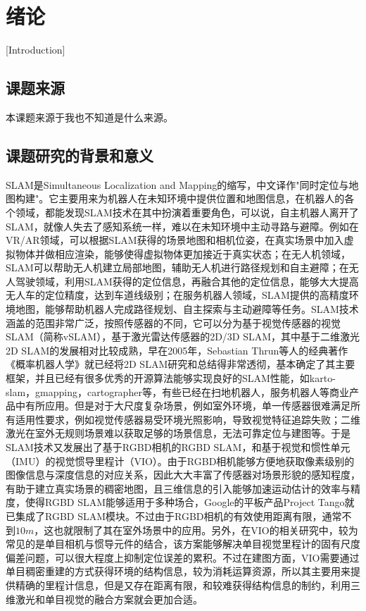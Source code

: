 
\chapter{绪论}[Introduction]

\section{课题来源}
本课题来源于我也不知道是什么来源。

\section{课题研究的背景和意义}%
SLAM是Simultaneous Localization and Mapping的缩写，中文译作"同时定位与地图构建"\cite{Gao2017SLAM}。它主要用来为机器人在未知环境中提供位置和地图信息，在机器人的各个领域，都能发现SLAM技术在其中扮演着重要角色，可以说，自主机器人离开了SLAM，就像人失去了感知系统一样，难以在未知环境中主动寻路与避障。例如在VR/AR领域，可以根据SLAM获得的场景地图和相机位姿，在真实场景中加入虚拟物体并做相应渲染，能够使得虚拟物体更加接近于真实状态；在无人机领域，SLAM可以帮助无人机建立局部地图，辅助无人机进行路径规划和自主避障；在无人驾驶领域，利用SLAM获得的定位信息，再融合其他的定位信息，能够大大提高无人车的定位精度，达到车道线级别\cite{贺勇2015基于多传感器的车道级高精细地图制作方法}；在服务机器人领域，SLAM提供的高精度环境地图，能够帮助机器人完成路径规划、自主探索与主动避障等任务。SLAM技术涵盖的范围非常广泛，按照传感器的不同，它可以分为基于视觉传感器的视觉SLAM（简称vSLAM），基于激光雷达传感器的2D/3D SLAM，其中基于二维激光2D SLAM的发展相对比较成熟，早在2005年，Sebastian Thrun等人的经典著作《概率机器人学》\cite{thrun2002probabilistic}就已经将2D SLAM研究和总结得非常透彻，基本确定了其主要框架，并且已经有很多优秀的开源算法能够实现良好的SLAM性能，如karto-slam，gmapping，cartographer等，有些已经在扫地机器人，服务机器人等商业产品中有所应用。但是对于大尺度复杂场景，例如室外环境，单一传感器很难满足所有适用性要求\cite{贺一家2018基于多传感器信息融合的视觉}，例如视觉传感器易受环境光照影响，导致视觉特征追踪失败；二维激光在室外无规则场景难以获取足够的场景信息，无法可靠定位与建图等。于是SLAM技术又发展出了基于RGBD相机的RGBD SLAM，和基于视觉和惯性单元（IMU）的视觉惯导里程计（VIO）。由于RGBD相机能够方便地获取像素级别的图像信息与深度信息的对应关系，因此大大丰富了传感器对场景形貌的感知程度，有助于建立真实场景的稠密地图，且三维信息的引入能够加速运动估计的效率与精度，使得RGBD SLAM能够适用于多种场合，Google的平板产品Project Tango就已集成了RGBD SLAM模块。不过由于RGBD相机的有效使用距离有限，通常不到$10m$，这也就限制了其在室外场景中的应用。另外，在VIO的相关研究中，较为常见的是单目相机与惯导元件的结合，该方案能够解决单目视觉里程计的固有尺度偏差问题，可以很大程度上抑制定位误差的累积。不过在建图方面，VIO需要通过单目稠密重建的方式获得环境的结构信息，较为消耗运算资源，所以其主要用来提供精确的里程计信息，但是又存在距离有限，和较难获得结构信息的制约，利用三维激光和单目视觉的融合方案就会更加合适。

